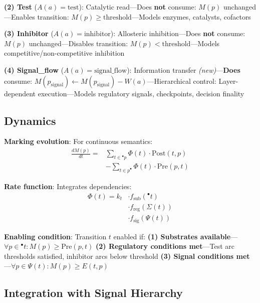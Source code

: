 \documentclass[twocolumn,11pt]{article}
\begin{document}
\vspace{3pt}
\noindent\textbf{(2) Test} ($A(a) = \text{test}$): Catalytic read---Does \textbf{not} consume: $M(p)$ unchanged---Enables transition: $M(p) \geq \text{threshold}$---Models enzymes, catalysts, cofactors

\vspace{3pt}
\noindent\textbf{(3) Inhibitor} ($A(a) = \text{inhibitor}$): Allosteric inhibition---Does \textbf{not} consume: $M(p)$ unchanged---Disables transition: $M(p) < \text{threshold}$---Models competitive/non-competitive inhibition

\vspace{3pt}
\noindent\textbf{(4) Signal\_flow} ($A(a) = \text{signal\_flow}$): Information transfer \textit{(new)}---\textbf{Does} consume: $M(p_{\text{signal}}) \gets M(p_{\text{signal}}) - W(a)$---Hierarchical control: Layer-dependent execution---Models regulatory signals, checkpoints, decision finality

\subsection{Dynamics}

\vspace{3pt}
\noindent\textbf{Marking evolution}: For continuous semantics:
\begin{align*}
\frac{dM(p)}{dt} = &\sum_{t \in {}^\bullet p} \Phi(t) \cdot \text{Post}(t, p) \\
&- \sum_{t \in p^\bullet} \Phi(t) \cdot \text{Pre}(p, t)
\end{align*}

\vspace{3pt}
\noindent\textbf{Rate function}: Integrates dependencies:
\begin{align*}
\Phi(t) = k_t &\cdot f_{\text{sub}}({}^\bullet t) \\
&\cdot f_{\text{reg}}(\Sigma(t)) \\
&\cdot f_{\text{sig}}(\Psi(t))
\end{align*}

\vspace{3pt}
\noindent\textbf{Enabling condition}: Transition $t$ enabled if: \textbf{(1) Substrates available}---$\forall p \in {}^\bullet t: M(p) \geq \text{Pre}(p, t)$ \textbf{(2) Regulatory conditions met}---Test arc thresholds satisfied, inhibitor arcs below threshold \textbf{(3) Signal conditions met}---$\forall p \in \Psi(t): M(p) \geq E(t, p)$

\subsection{Integration with Signal Hierarchy}
\end{document}
